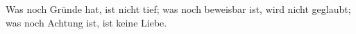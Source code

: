 Was noch Gründe hat, ist nicht tief; was noch beweisbar ist, wird nicht geglaubt; was noch Achtung ist, ist keine Liebe.
\par


